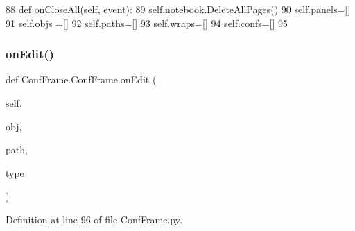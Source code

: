 \begin{DoxyCode}
88     \textcolor{keyword}{def }onCloseAll(self, event):
89         self.notebook.DeleteAllPages()
90         self.panels=[]
91         self.objs =[]
92         self.paths=[]
93         self.wraps=[]
94         self.confs=[]
95 
\end{DoxyCode}
\mbox{\label{classConfFrame_1_1ConfFrame_aaec4c61352cd88fbb16f230df55cc4bc}} 
\subsubsection{\texorpdfstring{on\+Edit()}{onEdit()}}
{\footnotesize\ttfamily def Conf\+Frame.\+Conf\+Frame.\+on\+Edit (\begin{DoxyParamCaption}\item[{}]{self,  }\item[{}]{obj,  }\item[{}]{path,  }\item[{}]{type }\end{DoxyParamCaption})}



Definition at line 96 of file Conf\+Frame.\+py.



